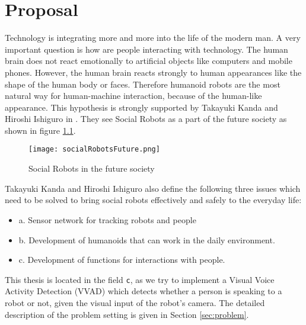 \chapter{Proposal}\label{cha:Proposal}
Technology is integrating more and more into the life of the modern man. A very important
question is how are people interacting with technology.
The human brain does not react emotionally to artificial objects like computers and
mobile phones. However, the human brain reacts strongly to human appearances like
the shape of the human body or faces. Therefore humanoid robots are the most
natural way for human-machine interaction, because of the human-like appearance.
This hypothesis is strongly supported by Takayuki Kanda and Hiroshi Ishiguro in \cite{kanda2017human}.
They see Social Robots as a part of the future society as shown in figure \ref{fig:socialRobotsFuture}.
\begin{figure}
  \centering
  \texttt{[image: socialRobotsFuture.png]}
  \caption{Social Robots in the future society \cite{kanda2017human}}
  \label{fig:socialRobotsFuture}
\end{figure}
Takayuki Kanda and Hiroshi Ishiguro also define the following three issues which
need to be solved to bring social robots effectively and safely to the everyday life:
\begin{itemize}
  \item {a.} Sensor network for tracking robots and people
  \item {b.} Development of humanoids that can work in the daily environment.
  \item {c.} Development of functions for interactions with people.
\end{itemize}
This thesis is located in the field \texttt{c}, as we try to implement a Visual Voice Activity Detection (VVAD) which detects whether a person is speaking to a robot or not, given the visual input of the robot's camera. The detailed description of the problem
setting is given in Section \ref{sec:problem}.


